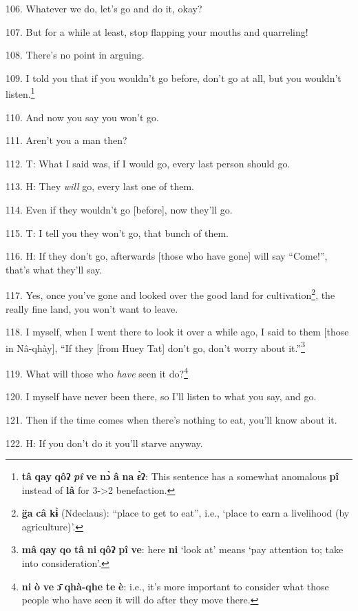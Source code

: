106. Whatever we do, let's go and do it, okay?

107. But for a while at least, stop flapping your mouths and quarreling!

108. There's no point in arguing.

109. I told you that if you wouldn't go before, don't go at all, but you wouldn't
listen.\footnote{\textbf{tâ} \textbf{qay} \textbf{qôʔ} \textit{\textbf{pî}} \textbf{ve} \textbf{nɔ̀} \textbf{â} \textbf{na} \textbf{ɛ̀ʔ}: This sentence has a somewhat anomalous \textbf{pî} instead of \textbf{lâ} for 3->2 benefaction.}

110. And now you say you won't go.

111. Aren't you a man then?

112. T: What I said was, if I would go, every last person should go.

113. H: They \textit{will} go, every last one of them.

114. Even if they wouldn't go [before], now they'll go.

115. T: I tell you they won't go, that bunch of them.

116. H: If they don't go, afterwards [those who have gone] will say ``Come!'',
that's what they'll say.

117. Yes, once you've gone and looked over the good land for cultivation\footnote{\textbf{g̈a} \textbf{câ} \textbf{kɨ̀} (Ndeclaus): ``place to get to eat'', i.e., `place to earn a livelihood (by agriculture)'.},
the really fine land, you won't want to leave.

118. I myself, when I went there to look it over a while ago, I said to them [those
in Nâ-qhày], ``If they [from Huey Tat] don't go, don't worry about it.''\footnote{\textbf{mâ} \textbf{qay} \textbf{qo} \textbf{tâ} \textbf{ni} \textbf{qôʔ} \textbf{pî} \textbf{ve}: here \textbf{ni} `look at' means `pay attention to; take into consideration'.}

119. What will those who \textit{have} seen it do?\footnote{\textbf{ni} \textbf{ò} \textbf{ve} \textbf{ɔ̄} \textbf{qhà-qhe} \textbf{te} \textbf{è}: i.e., it's more important to consider what those people who have seen it will do after they move there.}

120. I myself have never been there, so I'll listen to what you say, and go.

121. Then if the time comes when there's nothing to eat, you'll know about it.

122. H: If you don't do it you'll starve anyway.

